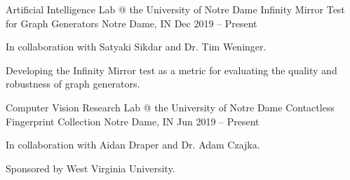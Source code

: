 


\begin{cventries}


    \cventry
    {Artificial Intelligence Lab @ the University of Notre Dame} %
    {Infinity Mirror Test for Graph Generators} %
    {Notre Dame, IN} %
    {Dec 2019 -- Present} %
    {
        \begin{cvitems} %
        \item{In collaboration with Satyaki Sikdar and Dr. Tim Weninger.}
        \item{Developing the Infinity Mirror test as a metric for evaluating the quality and robustness of graph generators.}
        \end{cvitems}
    }


    \cventry
    {Computer Vision Research Lab @ the University of Notre Dame} %
    {Contactless Fingerprint Collection} %
    {Notre Dame, IN} %
    {Jun 2019 -- Present} %
    {
        \begin{cvitems} %
        \item{In collaboration with Aidan Draper and Dr. Adam Czajka.}
        \item{Sponsored by West Virginia University.}
        \end{cvitems}
    }




\end{cventries}
